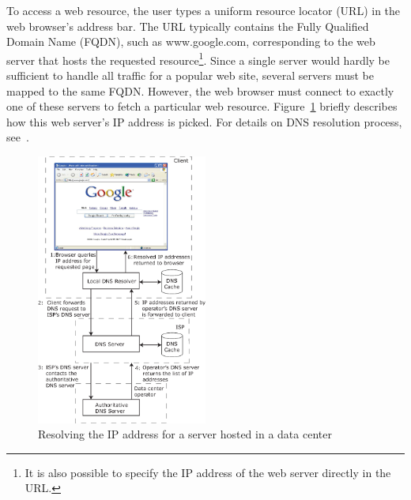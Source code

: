 To access a web resource, the user types a uniform resource locator (URL) in the web browser's address bar. The URL typically contains the Fully Qualified Domain Name (FQDN), such as www.google.com, corresponding to the web server that hosts the requested resource\footnote{It is also possible to specify the IP address of the web server directly in the URL.}. Since a single server would hardly be sufficient to handle all traffic for a popular web site, several servers must be mapped to the same FQDN. However, the web browser must connect to exactly one of these servers to fetch a particular web resource. Figure~\ref{fig:dcloadbalance} briefly describes how this web server's IP address is picked. For details on DNS resolution process, see~\cite{rfc1034,rfc1035}. 

\begin{figure}
\centering
\includegraphics[width=0.5\textwidth]{pics/dcloadbalance.eps}
\caption{Resolving the IP address for a server hosted in a data center}
\label{fig:dcloadbalance}
\end{figure}

